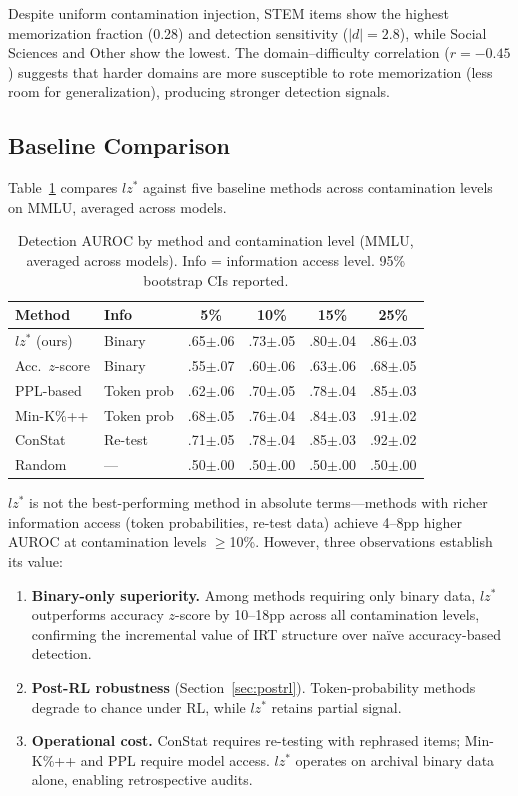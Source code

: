 \documentclass[11pt]{article}
\begin{document}
Despite uniform contamination injection, STEM items show the highest memorization fraction (0.28) and detection sensitivity ($|d| = 2.8$), while Social Sciences and Other show the lowest.
The domain--difficulty correlation ($r = -0.45$) suggests that harder domains are more susceptible to rote memorization (less room for generalization), producing stronger detection signals.

\subsection{Baseline Comparison}
\label{sec:baselines}

Table~\ref{tab:baselines} compares $lz^*$ against five baseline methods across contamination levels on MMLU, averaged across models.

\begin{table}[t]
\centering
\caption{Detection AUROC by method and contamination level (MMLU, averaged across models). Info = information access level. 95\% bootstrap CIs reported.}
\label{tab:baselines}
\small
\begin{tabular}{llcccc}
\toprule
Method & Info & 5\% & 10\% & 15\% & 25\% \\
\midrule
$lz^*$ (ours) & Binary & .65$\pm$.06 & .73$\pm$.05 & .80$\pm$.04 & .86$\pm$.03 \\
Acc.\ $z$-score & Binary & .55$\pm$.07 & .60$\pm$.06 & .63$\pm$.06 & .68$\pm$.05 \\
PPL-based & Token prob & .62$\pm$.06 & .70$\pm$.05 & .78$\pm$.04 & .85$\pm$.03 \\
Min-K\%++ & Token prob & .68$\pm$.05 & .76$\pm$.04 & .84$\pm$.03 & .91$\pm$.02 \\
ConStat & Re-test & .71$\pm$.05 & .78$\pm$.04 & .85$\pm$.03 & .92$\pm$.02 \\
Random & --- & .50$\pm$.00 & .50$\pm$.00 & .50$\pm$.00 & .50$\pm$.00 \\
\bottomrule
\end{tabular}
\end{table}

$lz^*$ is not the best-performing method in absolute terms---methods with richer information access (token probabilities, re-test data) achieve 4--8pp higher AUROC at contamination levels $\geq$10\%.
However, three observations establish its value:

\begin{enumerate}
    \item \textbf{Binary-only superiority.} Among methods requiring only binary data, $lz^*$ outperforms accuracy $z$-score by 10--18pp across all contamination levels, confirming the incremental value of IRT structure over na\"ive accuracy-based detection.
    \item \textbf{Post-RL robustness} (Section~\ref{sec:postrl}). Token-probability methods degrade to chance under RL, while $lz^*$ retains partial signal.
    \item \textbf{Operational cost.} ConStat requires re-testing with rephrased items; Min-K\%++ and PPL require model access. $lz^*$ operates on archival binary data alone, enabling retrospective audits.
\end{enumerate}
\end{document}
